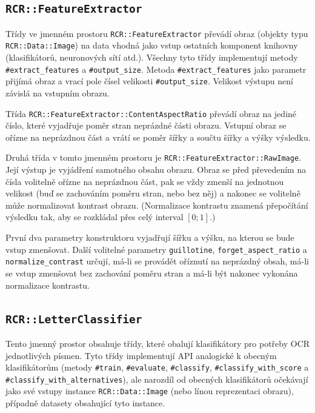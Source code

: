 \documentclass[a4paper]{article}
\begin{document}
\subsection{\texttt{RCR::FeatureExtractor}}
Třídy ve jmenném prostoru \texttt{RCR::FeatureExtractor} převádí obraz (objekty
typu \texttt{RCR::Data::Image}) na data vhodná jako vstup ostatních komponent
knihovny (klasifikátorů, neuronových sítí atd.).
Všechny tyto třídy implementují metody \texttt{\#extract\_features} a
\texttt{\#output\_size}. Metoda \texttt{\#extract\_features} jako parametr
přijímá obraz a vrací pole čísel velikosti \texttt{\#output\_size}.
Velikost výstupu není závislá na vstupním obrazu.

Třída \texttt{RCR::FeatureExtractor::ContentAspectRatio} převádí obraz na jediné
číslo, které vyjadřuje poměr stran neprázdné části obrazu. Vstupní obraz se
ořízne na neprázdnou část a vrátí se poměr šířky a součtu šířky a výšky výsledku.

Druhá třída v tomto jmenném prostoru je \texttt{RCR::FeatureExtractor::RawImage}.
Její výstup je vyjádření samotného obsahu obrazu. Obraz se před převedením na
čísla volitelně ořízne na neprázdnou část, pak se vždy zmenší na jednotnou velikost
(buď se zachováním poměru stran, nebo bez něj) a nakonec se volitelně může
normalizovat kontrast obrazu. (Normalizace kontrastu znamená přepočítání
výsledku tak, aby se rozkládal přes celý interval $[0;1]$.)

První dva parametry konstruktoru vyjadřují šířku a výšku, na kterou se bude
vstup zmenšovat. Další volitelné parametry \texttt{guillotine},
\texttt{forget\_aspect\_ratio} a \texttt{normalize\_contrast} určují, má-li
se provádět oříznutí na neprázdný obsah, má-li se vstup zmenšovat bez zachování
poměru stran a má-li být nakonec vykonána normalizace kontrastu.

\subsection{\texttt{RCR::LetterClassifier}}
Tento jmenný prostor obsahuje třídy, které obalují klasifikátory pro potřeby
OCR jednotlivých písmen. Tyto třídy implementují API analogické k obecným
klasifikátorům (metody \texttt{\#train}, \texttt{\#evaluate}, \texttt{\#classify},
\texttt{\#classify\_with\_score} a \texttt{\#classify\_with\_alternatives}),
ale narozdíl od obecných klasifikátorů očekávají jako své vstupy instance \texttt{RCR::Data::Image}
(nebo línou
reprezentaci obrazu), případně datasety obsahující tyto instance.
\end{document}
